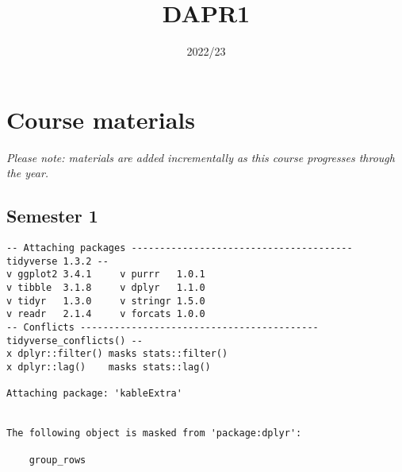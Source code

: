 \documentclass[
  letterpaper,
  DIV=11,
  numbers=noendperiod]{scrartcl}
\title{DAPR1}
\subtitle{2022/23}
\author{}
\date{}
\begin{document}
\maketitle
\ifdefined\Shaded\renewenvironment{Shaded}{\begin{tcolorbox}[frame hidden, sharp corners, enhanced, breakable, interior hidden, boxrule=0pt, borderline west={3pt}{0pt}{shadecolor}]}{\end{tcolorbox}}\fi

\hypertarget{course-materials}{%
\section{Course materials}\label{course-materials}}

\emph{Please note: materials are added incrementally as this course
progresses through the year.}

\hypertarget{semester-1}{%
\subsection{Semester 1}\label{semester-1}}

\begin{verbatim}
-- Attaching packages --------------------------------------- tidyverse 1.3.2 --
v ggplot2 3.4.1     v purrr   1.0.1
v tibble  3.1.8     v dplyr   1.1.0
v tidyr   1.3.0     v stringr 1.5.0
v readr   2.1.4     v forcats 1.0.0
-- Conflicts ------------------------------------------ tidyverse_conflicts() --
x dplyr::filter() masks stats::filter()
x dplyr::lag()    masks stats::lag()

Attaching package: 'kableExtra'


The following object is masked from 'package:dplyr':

    group_rows
\end{verbatim}
\end{document}
